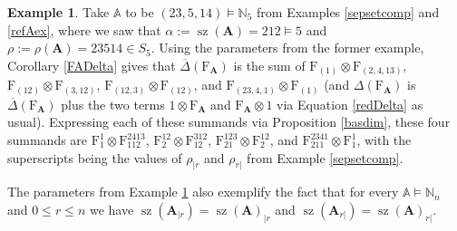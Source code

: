 \documentclass{article}
\theoremstyle{definition}
\newtheorem{ex}[thm]{Example}
\begin{document}
\begin{ex}
Take $\mathbb{A}$ to be $(23,5,14)\vDash\mathbb{N}_{5}$ from Examples \ref{sepsetcomp} and \ref{refAex}, where we saw that $\alpha:=\operatorname{sz}(\mathbf{A})=212\vDash5$ and $\rho:=\rho(\mathbf{A})=23514 \in S_{5}$. Using the parameters from the former example, Corollary \ref{FADelta} gives that $\overline{\Delta}(\mathrm{F}_{\mathbf{A}})$ is the sum of $\mathrm{F}_{(1)}\otimes\mathrm{F}_{(2,4,13)}$, $\mathrm{F}_{(12)}\otimes\mathrm{F}_{(3,12)}$, $\mathrm{F}_{(12,3)}\otimes\mathrm{F}_{(12)}$, and $\mathrm{F}_{(23,4,1)}\otimes\mathrm{F}_{(1)}$ (and $\Delta(\mathrm{F}_{\mathbf{A}})$ is $\overline{\Delta}(\mathrm{F}_{\mathbf{A}})$ plus the two terms $1\otimes\mathrm{F}_{\mathbf{A}}$ and $\mathrm{F}_{\mathbf{A}}\otimes1$ via Equation \eqref{redDelta} as usual). Expressing each of these summands via Proposition \ref{basdim}, these four summands are $\mathrm{F}_{1}^{1}\otimes\mathrm{F}_{112}^{2413}$, $\mathrm{F}_{2}^{12}\otimes\mathrm{F}_{12}^{312}$, $\mathrm{F}_{21}^{123}\otimes\mathrm{F}_{2}^{12}$, and $\mathrm{F}_{211}^{2341}\otimes\mathrm{F}_{1}^{1}$, with the superscripts being the values of $\rho_{|r}$ and $\rho_{r|}$ from Example \ref{sepsetcomp}. \label{exDeltaFA}
\end{ex}
The parameters from Example \ref{exDeltaFA} also exemplify the fact that for every $\mathbb{A}\vDash\mathbb{N}_{n}$ and $0 \leq r \leq n$ we have $\operatorname{sz}(\mathbf{A}_{|r})=\operatorname{sz}(\mathbf{A})_{|r}$ and $\operatorname{sz}(\mathbf{A}_{r|})=\operatorname{sz}(\mathbf{A})_{r|}$.

\medskip
\end{document}
